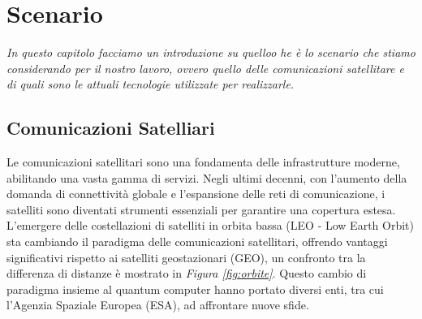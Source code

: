 
\chapter{Scenario} %

\label{Chapter3} %

\textit{In questo capitolo facciamo un introduzione su quelloo he è lo scenario che stiamo considerando per il nostro lavoro, ovvero 
quello delle comunicazioni satellitare e di quali sono le attuali tecnologie utilizzate per realizzarle.}


\section{Comunicazioni Satelliari}


Le comunicazioni satellitari sono una fondamenta delle infrastrutture moderne, abilitando una vasta gamma di servizi.
Negli ultimi decenni, con l'aumento della domanda di connettività globale e l'espansione delle reti di comunicazione, i satelliti sono diventati strumenti essenziali per garantire una copertura estesa.
L'emergere delle costellazioni di satelliti in orbita bassa (LEO - Low Earth Orbit) sta cambiando il paradigma delle comunicazioni satellitari, offrendo vantaggi significativi rispetto ai satelliti geostazionari (GEO), un confronto tra la differenza di distanze è mostrato in \textit{Figura \ref{fig:orbite}}. 
Questo cambio di paradigma insieme al quantum computer hanno portato diversi enti, tra cui l'Agenzia Spaziale Europea (ESA), ad affrontare nuove sfide.

